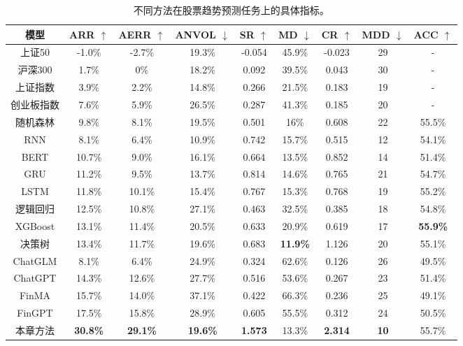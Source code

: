 \begin{table}
	\caption{\label{stock_trend_pred_table}不同方法在股票趋势预测任务上的具体指标。}
	\centering{}%
	\small 
	\begin{tabular}{ccccccccc}
		\toprule[2pt]
		模型 & ARR $\uparrow$ & AERR $\uparrow$ & ANVOL $\downarrow$ & SR $\uparrow$ & MD $\downarrow$ & CR $\uparrow$ & MDD $\downarrow$ & ACC $\uparrow$ \\
		\hline
		上证50 & -1.0\% & -2.7\% & 19.3\% & -0.054 & 45.9\% & -0.023 & 29 & - \\
		沪深300 & 1.7\% & 0\% & 18.2\% & 0.092 & 39.5\% & 0.043 & 30 & - \\
		上证指数 & 3.9\% & 2.2\% & 14.8\% & 0.266 & 21.5\% & 0.183 & 19 & - \\
		创业板指数 & 7.6\% & 5.9\% & 26.5\% & 0.287 & 41.3\% & 0.185 & 20 & - \\
		\hline
		随机森林 & 9.8\% & 8.1\% & 19.5\% & 0.501 & 16\% & 0.608 & 22 & 55.5\% \\
		RNN & 8.1\% & 6.4\% & 10.9\% & 0.742 & 15.7\% & 0.515 & 12 & 54.1\% \\
		BERT & 10.7\% & 9.0\% & 16.1\% & 0.664 & 13.5\% & 0.852 & 14 & 51.4\% \\
		GRU & 11.2\% & 9.5\% & 13.7\% & 0.814 & 14.6\% & 0.765 & 21 & 54.7\% \\
		LSTM & 11.8\% & 10.1\% & 15.4\% & 0.767 & 15.3\% & 0.768 & 19 & 55.2\% \\
		逻辑回归 & 12.5\% & 10.8\% & 27.1\% & 0.463 & 32.5\% & 0.385 & 18 & 54.8\% \\
		XGBoost & 13.1\% & 11.4\% & 20.5\% & 0.633 & 20.9\% & 0.619 & 17 & \textbf{55.9\%} \\
		决策树 & 13.4\% & 11.7\% & 19.6\% & 0.683 & \textbf{11.9\%} & 1.126 & 20 & 55.1\% \\
		\hline
		ChatGLM & 8.1\% & 6.4\% & 24.9\% & 0.324 & 62.6\% & 0.126 & 26 & 49.5\% \\
		ChatGPT & 14.3\% & 12.6\% & 27.7\% & 0.516 & 53.6\% & 0.267 & 23 & 51.4\% \\
		FinMA & 15.7\% & 14.0\% & 37.1\% & 0.422 & 66.3\% & 0.236 & 25 & 49.1\% \\
		FinGPT & 17.5\% & 15.8\% & 28.9\% & 0.605 & 55.5\% & 0.312 & 24 & 50.5\% \\
		\hline
		本章方法 & \textbf{30.8\%} & \textbf{29.1\%} & \textbf{19.6\%} & \textbf{1.573} & 13.3\% & \textbf{2.314} & \textbf{10} & 55.7\% \\
		\bottomrule[2pt]
	\end{tabular}
\end{table}

